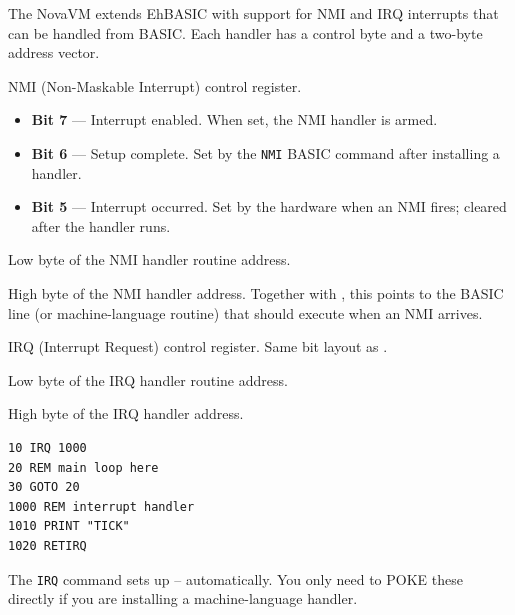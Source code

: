 The NovaVM extends EhBASIC with support for NMI and IRQ interrupts that can
be handled from BASIC.  Each handler has a control byte and a two-byte
address vector.


NMI (Non-Maskable Interrupt) control register.


\begin{itemize}
  \item \textbf{Bit 7} --- Interrupt enabled.  When set, the NMI handler is armed.
  \item \textbf{Bit 6} --- Setup complete.  Set by the \texttt{NMI} BASIC command
        after installing a handler.
  \item \textbf{Bit 5} --- Interrupt occurred.  Set by the hardware when an NMI
        fires; cleared after the handler runs.
\end{itemize}


Low byte of the NMI handler routine address.


High byte of the NMI handler address.  Together with , this points
to the BASIC line (or machine-language routine) that should execute when an
NMI arrives.


IRQ (Interrupt Request) control register.  Same bit layout as .



Low byte of the IRQ handler routine address.


High byte of the IRQ handler address.

\begin{lstlisting}
10 IRQ 1000
20 REM main loop here
30 GOTO 20
1000 REM interrupt handler
1010 PRINT "TICK"
1020 RETIRQ
\end{lstlisting}

The \texttt{IRQ} command sets up -- automatically.  You
only need to POKE these directly if you are installing a machine-language
handler.


